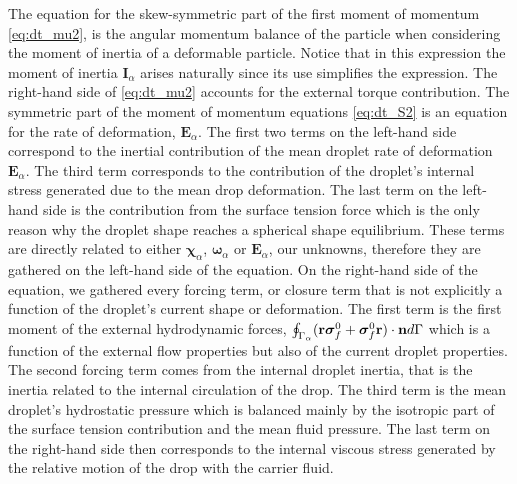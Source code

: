 The equation for the skew-symmetric part of the first moment of momentum \ref{eq:dt_mu2}, is the angular momentum balance of the particle when considering the moment of inertia of a deformable particle.
Notice that in this expression the moment of inertia $\textbf{I}_\alpha$ arises naturally since its use simplifies the expression. 
The right-hand side of \ref{eq:dt_mu2} accounts for the external torque contribution. 
The symmetric part of the moment of momentum equations \ref{eq:dt_S2} is an equation for the rate of deformation, $\textbf{E}_\alpha$. 
The first two terms on the left-hand side correspond to the inertial contribution of the mean droplet rate of deformation $\textbf{E}_\alpha$. 
The third term corresponds to the contribution of the droplet's internal stress generated due to the mean drop deformation. 
The last term on the left-hand side is the contribution from the surface tension force which is the only reason why the droplet shape reaches a spherical shape equilibrium. 
These terms are directly related to either $\bm\chi_\alpha$, $\bm\omega_\alpha$ or $\textbf{E}_\alpha$, our unknowns, therefore they are gathered on the left-hand side of the equation. 
On the right-hand side of the equation, we gathered every forcing term, or closure term that is not explicitly a function of the droplet's current shape or deformation.  
The first term is the first moment of the external hydrodynamic forces, $\oint_{\Gamma_{\alpha}} (\textbf{r}\bm\sigma_f^0+ \bm\sigma_f^0\textbf{r})\cdot \textbf{n} d\Gamma$ which is a function of the external flow properties but also of the current droplet properties. 
The second forcing term comes from the internal droplet inertia, that is the inertia related to the internal circulation of the drop. 
The third term is the mean droplet's hydrostatic pressure which is balanced mainly by the isotropic part of the surface tension contribution and the mean fluid pressure. 
The last term on the right-hand side then corresponds to the internal viscous stress generated by the relative motion of the drop with the carrier fluid. 

